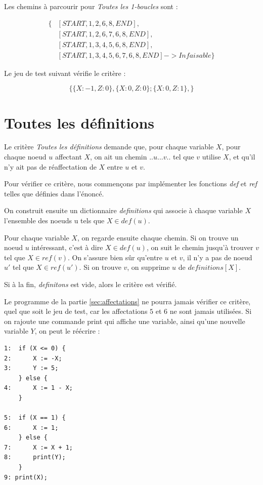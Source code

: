 Les chemins à parcourir pour \textit{Toutes les 1-boucles} sont :

\begin{align*}
\{
&[START, 1, 2, 6, 8, END], \\
&[START, 1, 2, 6, 7, 6, 8, END], \\
&[START, 1, 3, 4, 5, 6, 8, END], \\
&[START, 1, 3, 4, 5, 6, 7, 6, 8, END] -> Infaisable
\}
\end{align*}

Le jeu de test suivant vérifie le critère :

\[ \{
	\{ X : -1, Z : 0\},
	\{ X : 0, Z : 0\};
	\{ X : 0, Z : 1\},
\} \]

\section{Toutes les définitions}

Le critère \textit{Toutes les définitions} demande que, pour chaque variable $X$, pour chaque noeud $u$ affectant $X$, on ait un chemin $..u...v..$ tel que $v$ utilise $X$, et qu'il n'y ait pas de réaffectation de $X$ entre $u$ et $v$.

Pour vérifier ce critère, nous commençons par implémenter les fonctions \textit{def} et \textit{ref} telles que définies dans l'énoncé.

On construit ensuite un dictionnaire \textit{definitions} qui associe à chaque variable $X$ l'ensemble des noeuds u tels que $X \in def(u)$.

Pour chaque variable $X$, on regarde ensuite chaque chemin. Si on trouve un noeud $u$ intéressant, c'est à dire $X \in def(u)$, on suit le chemin jusqu'à trouver $v$ tel que $X \in ref(v)$. On s'assure bien sûr qu'entre $u$ et $v$, il n'y a pas de noeud $u'$ tel que $X \in ref(u')$. Si on trouve $v$, on supprime $u$ de $\textit{definitions}[X]$.

Si à la fin, \textit{definitons} est vide, alors le critère est vérifié.

Le programme de la partie \ref{sec:affectations} ne pourra jamais vérifier ce critère, quel que soit le jeu de test, car les affectations $5$ et $6$ ne sont jamais utilisées. Si on rajoute une commande print qui affiche une variable, ainsi qu'une nouvelle variable $Y$, on peut le réécrire :


\begin{verbatim}
1:  if (X <= 0) {
2:      X := -X;
3:		Y := 5;
    } else {
4:      X := 1 - X;
    }

5:  if (X == 1) {
6:      X := 1;
    } else {
7:      X := X + 1;
8:		print(Y);
    }
9: print(X);
\end{verbatim}

